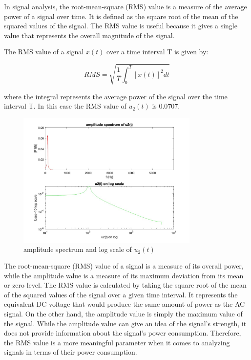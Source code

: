 \documentclass[
	a4paper,
	11pt,
]{article}
\begin{document}
In signal analysis, the root-mean-square (RMS) value is a measure of the average power of a signal over time. It is defined as the square root of the mean of the squared values of the signal. The RMS value is useful because it gives a single value that represents the overall magnitude of the signal. 

The RMS value of a signal \(x(t)\) over a time interval T is given by:

\begin{equation}
RMS = \sqrt{\frac{1}{T} \int_{0}^{T} [x(t)]^2 dt}
\end{equation}

where the integral represents the average power of the signal over the time interval T. In this case the RMS value of \(u_2(t)\) is 0.0707.
\begin{figure}[htb!]
    \centerline{\includegraphics[width=9cm]{A4/a4.image2.jpg}}
    \caption{amplitude spectrum and log scale of \(u_2(t)\)}
\end{figure}

The root-mean-square (RMS) value of a signal is a measure of its overall power, while the amplitude value is a measure of its maximum deviation from its mean or zero level. The RMS value is calculated by taking the square root of the mean of the squared values of the signal over a given time interval. It represents the equivalent DC voltage that would produce the same amount of power as the AC signal. On the other hand, the amplitude value is simply the maximum value of the signal. While the amplitude value can give an idea of the signal's strength, it does not provide information about the signal's power consumption. Therefore, the RMS value is a more meaningful parameter when it comes to analyzing signals in terms of their power consumption.
\end{document}
